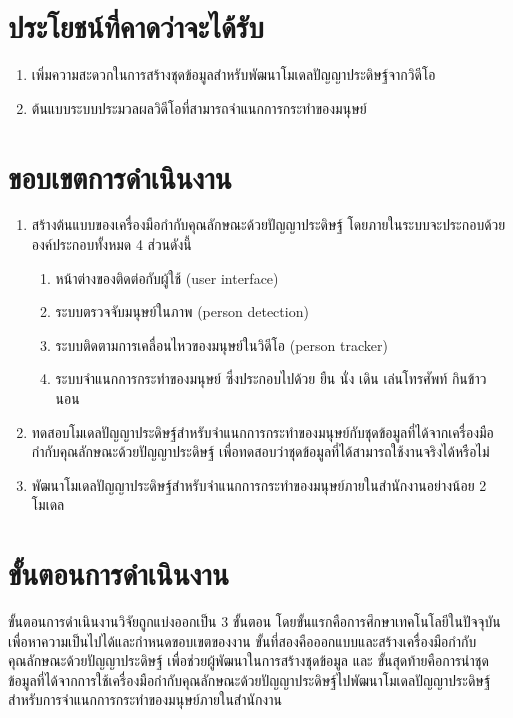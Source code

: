 
\section{ประโยชน์ที่คาดว่าจะได้รับ}
\begin{enumerate}
	\setlength\itemsep{-0.25em}
	\item เพิ่มความสะดวกในการสร้างชุดข้อมูลสำหรับพัฒนาโมเดลปัญญาประดิษฐ์จากวิดีโอ
	\item ต้นแบบระบบประมวลผลวิดีโอที่สามารถจำแนกการกระทำของมนุษย์
\end{enumerate}
\clearpage

\section{ขอบเขตการดำเนินงาน}
\begin{enumerate}
	\setlength\itemsep{-0.25em}
	\item สร้างต้นแบบของเครื่องมือกำกับคุณลักษณะด้วยปัญญาประดิษฐ์ โดยภายในระบบจะประกอบด้วยองค์ประกอบทั้งหมด 4 ส่วนดังนี้
	\begin{enumerate}
		\setlength\itemsep{-0.25em}
		\item หน้าต่างของติดต่อกับผู้ใช้ (user interface)
		\item ระบบตรวจจับมนุษย์ในภาพ (person detection)
		\item ระบบติดตามการเคลื่อนไหวของมนุษย์ในวิดีโอ (person tracker)
		\item ระบบจำแนกการกระทำของมนุษย์ ซึ่งประกอบไปด้วย ยืน นั่ง เดิน เล่นโทรศัพท์ กินข้าว นอน
	\end{enumerate}
	\item ทดสอบโมเดลปัญญาประดิษฐ์สำหรับจำแนกการกระทำของมนุษย์กับชุดข้อมูลที่ได้จากเครื่องมือกำกับคุณลักษณะด้วยปัญญาประดิษฐ์ เพื่อทดสอบว่าชุดข้อมูลที่ได้สามารถใช้งานจริงได้หรือไม่
	\item พัฒนาโมเดลปัญญาประดิษฐ์สำหรับจำแนกการกระทำของมนุษย์ภายในสำนักงานอย่างน้อย 2 โมเดล
\end{enumerate}

\section{ขั้นตอนการดำเนินงาน}
ขั้นตอนการดำเนินงานวิจัยถูกแบ่งออกเป็น 3 ขั้นตอน โดยขั้นแรกคือการศึกษาเทคโนโลยีในปัจจุบันเพื่อหาความเป็นไปได้และกำหนดขอบเขตของงาน 
ขั้นที่สองคือออกแบบและสร้างเครื่องมือกำกับคุณลักษณะด้วยปัญญาประดิษฐ์ เพื่อช่วยผู้พัฒนาในการสร้างชุดข้อมูล และ ขั้นสุดท้ายคือการนำชุดข้อมูลที่ได้จากการใช้เครื่องมือกำกับคุณลักษณะด้วยปัญญาประดิษฐ์ไปพัฒนาโมเดลปัญญาประดิษฐ์สำหรับการจำแนกการกระทำของมนุษย์ภายในสำนักงาน
